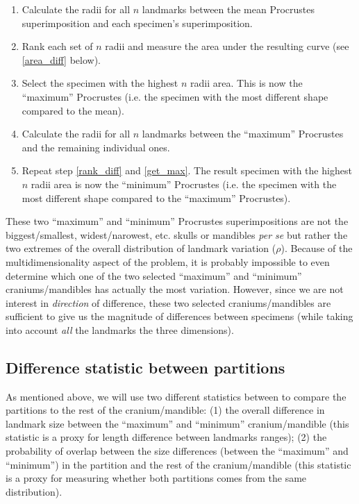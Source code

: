 \documentclass[a4paper,11pt]{article}
\begin{document}
\begin{enumerate}

 \item \label{mean_diff} Calculate the radii for all $n$ landmarks between the mean Procrustes superimposition and each specimen's superimposition.
 \item \label{rank_diff} Rank each set of $n$ radii and measure the area under the resulting curve (see \ref{area_diff} below).
 \item \label{get_max} Select the specimen with the highest $n$ radii area. This is now the ``maximum'' Procrustes (i.e. the specimen with the most different shape compared to the mean).
 \item \label{max_diff} Calculate the radii for all $n$ landmarks between the ``maximum'' Procrustes and the remaining individual ones.
 \item \label{min_diff} Repeat step \ref{rank_diff} and \ref{get_max}. The result specimen with the highest $n$ radii area is now the ``minimum'' Procrustes (i.e. the specimen with the most different shape compared to the ``maximum'' Procrustes).

\end{enumerate}

These two ``maximum'' and ``minimum'' Procrustes superimpositions are not the biggest/smallest, widest/narowest, etc. skulls or mandibles \textit{per se} but rather the two extremes of the overall distribution of landmark variation ($\rho$).
Because of the multidimensionality aspect of the problem, it is probably impossible to even determine which one of the two selected ``maximum'' and ``minimum'' craniums/mandibles has actually the most variation.
However, since we are not interest in \textit{direction} of difference, these two selected craniums/mandibles are sufficient to give us the magnitude of differences between specimens (while taking into account \textit{all} the landmarks the three dimensions).

\subsection{Difference statistic between partitions}

As mentioned above, we will use two different statistics between to compare the partitions to the rest of the cranium/mandible: (1) the overall difference in landmark size between the ``maximum'' and ``minimum'' cranium/mandible (this statistic is a proxy for length difference between landmarks ranges); (2) the probability of overlap between the size differences (between the ``maximum'' and ``minimum'') in the partition and the rest of the cranium/mandible (this statistic is a proxy for measuring whether both partitions comes from the same distribution).
\end{document}
